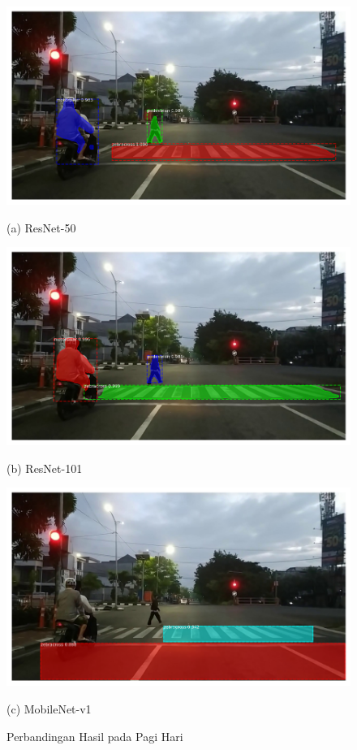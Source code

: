 \begin{figure}[h]
	\centering
	\begin{minipage}[b]{0.3\textwidth}
		\includegraphics[width=\textwidth]{gambar/fajar-frame800-resnet50.png}
		\caption*{(a) ResNet-50}
	\end{minipage}
	\hfill
	\begin{minipage}[b]{0.3\textwidth}
		\includegraphics[width=\textwidth]{gambar/fajar-frame800-resnet101.png}
		\caption*{(b) ResNet-101}
	\end{minipage}
	\hfill
	\begin{minipage}[b]{0.3\textwidth}
		\includegraphics[width=\textwidth]{gambar/fajar-frame800-mobilenetv1.png}
		\caption*{(c) MobileNet-v1}
	\end{minipage}
	\caption{{Perbandingan Hasil pada Pagi Hari}}
	\label{fig:comparasion-morning}
\end{figure}

